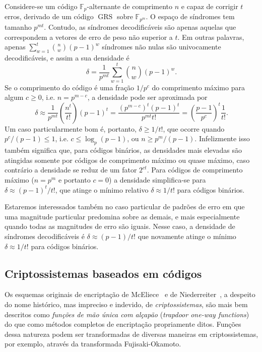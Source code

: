 \documentclass{SBCbookchapter}
\newcommand{\F}{\mathbb{F}}
\DeclareMathOperator{\GRS}{GRS}
\begin{document}
\begin{otherlanguage}{brazilian}
Considere-se um código $\F_p$-alternante de comprimento $n$ e capaz de corrigir $t$ erros, derivado de um código $\GRS$ sobre $\F_{p^m}$. O espaço de síndromes tem tamanho $p^{mt}$. Contudo, as síndromes decodificáveis são apenas aquelas que correspondem a vetores de erro de peso não superior a $t$. Em outras palavras, apenas $\sum_{w=1}^t{\binom{n}{w}(p - 1)^w}$ síndromes não nulas são univocamente decodificáveis, e assim a sua densidade é 
\[
\delta = \dfrac{1}{p^{mt}}\sum_{w=1}^t{\binom{n}{w}(p - 1)^w}.
\]
Se o comprimento do código é uma fração $1/p^c$ do comprimento máximo para algum $c \geqslant 0$, i.e. $n = p^{m - c}$, a densidade pode ser aproximada por
\[
\delta \approx \dfrac{1}{p^{mt}} \left(\dfrac{n^t}{t!}\right) (p - 1)^t = \dfrac{(p^{m - c})^t (p - 1)^t}{p^{mt} t!} =
\left(\dfrac{p - 1}{p^c}\right)^t \dfrac{1}{t!} .
\]
Um caso particularmente bom é, portanto, $\delta \geqslant 1/t!$, que ocorre quando $p^c/(p - 1) \leqslant 1$, i.e. $c \leqslant \log_p(p - 1)$, ou $n \geqslant p^m/(p-1)$. Infelizmente isso também significa que, para códigos binários, as densidades mais elevadas são atingidas somente por códigos de comprimento máximo ou quase máximo, caso contrário a densidade se reduz de um fator $2^{ct}$. Para códigos de comprimento máximo ($n = p^m$ e portanto $c = 0$) a densidade simplifica-se para $\delta \approx (p-1)^t/t!$, que atinge o mínimo relativo $\delta \approx 1/t!$ para códigos binários.

Estaremos interessados também no caso particular de padrões de erro em que uma magnitude particular predomina sobre as demais, e mais especialmente quando todas as magnitudes de erro são iguais. Nesse caso, a densidade de síndromes decodificáveis é $\delta \approx (p-1)/t!$ que novamente atinge o mínimo $\delta \approx 1/t!$ para códigos binários.

\subsection{Criptossistemas baseados em códigos}\label{subsec:coding-crypto}

Os esquemas originais de encriptação de McEliece~\cite{McEliece} e de Niederreiter~\cite{Niederreiter}, a despeito do nome histórico, mas impreciso e indevido, de \emph{criptossistemas}, são mais bem descritos como \emph{funções de mão única com alçapão} (\emph{trapdoor one-way functions}) do que como métodos completos de encriptação propriamente ditos. Funções dessa natureza podem ser transformadas de diversas maneiras em criptossistemas, por exemplo, através da transformada Fujisaki-Okamoto.


\end{otherlanguage}
\end{document}
